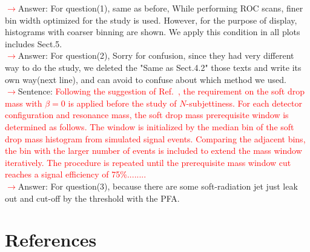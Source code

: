 \documentclass[final,1p,11pt]{elsarticle}
\begin{document}
\begin{itemize}
 \textcolor{red}{$\rightarrow$}Answer: For question(1), same as before, While performing ROC scans, finer bin width optimized for the study is used. However, for the purpose of display, histograms with coarser binning are shown. We apply this condition in all plots includes Sect.5.\\
 \textcolor{red}{$\rightarrow$}Answer: For question(2), Sorry for confusion, since they had very different way to do the study, we deleted the "Same as Sect.4.2" those texts and write its own way(next line), and can avoid to confuse about which method we used.\\
 \textcolor{red}{$\rightarrow$}Sentence: \textcolor{red}{Following the suggestion of Ref.~\cite{Dreyer:2018tjj}, the requirement on the 
soft drop mass with $\beta=0$ is applied before the study of $N$-subjettiness. 
For each detector configuration and resonance mass, the soft drop mass prerequisite window  
is determined as follows. The window is initialized by the median bin of the soft drop 
mass histogram from simulated signal events. Comparing the adjacent bins, the bin with the larger number of events is included to extend the mass window iteratively. The procedure is 
repeated until the prerequisite mass window cut reaches a signal  efficiency of 75\%........} \\
 \textcolor{red}{$\rightarrow$}Answer: For question(3), because there are some soft-radiation jet just leak out and cut-off by the threshold with the PFA.\\ 
\end{itemize}

\section*{References}


\def\bibname{\Large\bf References}
\def\refname{\Large\bf References}
\pagestyle{plain}

\end{document}
